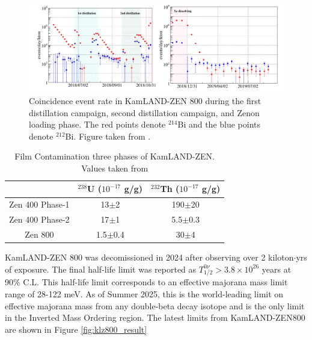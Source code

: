 \begin{figure}[htb]
	\centering
	\includegraphics[scale=0.3]{coincidencerate.png}
	\caption{Coincidence event rate in KamLAND-ZEN 800 during the first distillation campaign, second distillation campaign, and Zenon loading phase. The red points denote $^{214}$Bi and the blue points denote $^{212}$Bi. Figure taken from \cite{li_phd}.}
	\label{fig:coincidence_rate}
\end{figure}

\begin{table}[htb]
	\centering
	\renewcommand{\arraystretch}{1.2}
	\begin{tabular}{c|cc}
		\hline
		 & $^{238}$U ($10^{-17}$ g/g) & $^{232}$Th ($10^{-17}$ g/g)\\ \hline
		Zen 400 Phase-1 & 13$\pm$2 & 190$\pm$20 \\
		Zen 400 Phase-2 & 17$\pm$1 & 5.5$\pm$0.3 \\
		Zen 800 & 1.5$\pm$0.4 & 30$\pm$4 \\ \hline
	\end{tabular}
	\caption{Film Contamination three phases of KamLAND-ZEN. Values taken from \cite{ozaki_phd}}
	\label{tbl:filmcontamination}
\end{table}

KamLAND-ZEN 800 was decomissioned in 2024 after observing over 2 kiloton$\cdot$yrs of exposure. The final half-life limit was reported as $T_{1/2}^{0\nu} > 3.8\times 10^{26}$ years at 90\% C.L. This half-life limit corresponds to an effective majorana mass limit range of 28-122 meV. As of Summer 2025, this is the world-leading limit on effective majorana mass from any double-beta decay isotope and is the only limit in the Inverted Mass Ordering region. The latest limits from KamLAND-ZEN800 are shown in Figure \ref{fig:klz800_result}


